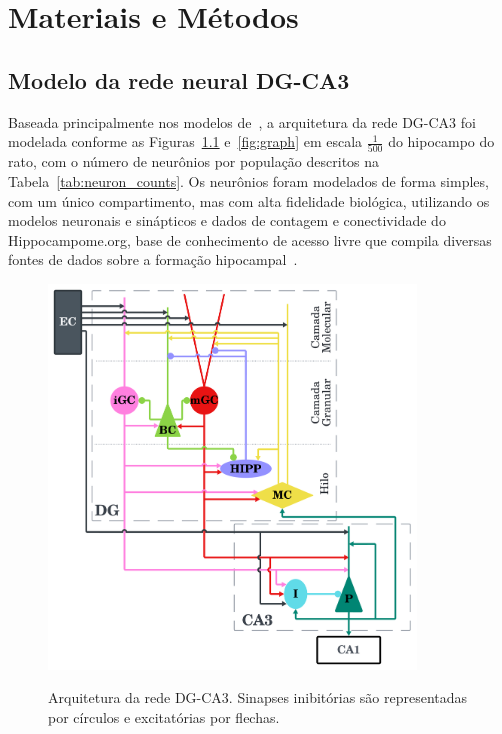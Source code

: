 \chapter{Materiais e Métodos}

\section{Modelo da rede neural DG-CA3}

Baseada principalmente nos modelos de~\cite{kopsickFormation2024,kimAdult2024,yangDynamic2025,chavlisDendrites2017}, a arquitetura
da rede DG-CA3 foi modelada conforme as Figuras~\ref{fig:arquitetura-rede} e~\ref{fig:graph} em escala $\frac{1}{500}$ do
hipocampo do rato, com o número de neurônios por população descritos na Tabela~\ref{tab:neuron_counts}. Os neurônios foram
modelados de forma simples, com um único compartimento, mas com alta fidelidade biológica, utilizando os modelos neuronais e
sinápticos e dados de contagem e conectividade do Hippocampome.org, base de conhecimento de acesso livre que compila diversas
fontes de dados sobre a formação hipocampal~\cite{wheelerHippocampomeorg2023}.

\begin{figure}[H]
    \centering
    \caption{Arquitetura da rede DG-CA3. Sinapses inibitórias são representadas por círculos e excitatórias por flechas.}
    \includegraphics[width=0.87\textwidth]{figuras/arquitetura-rede.png}
    \label{fig:arquitetura-rede}
\end{figure}

